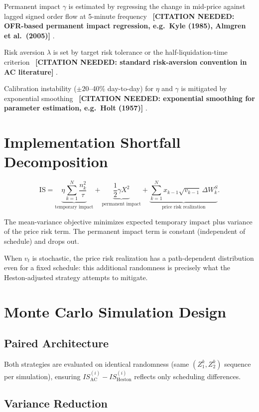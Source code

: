 \documentclass[11pt]{article}
\newcommand{\needscite}[1]{%
  {\color{red}\textbf{[CITATION NEEDED: #1]}}%
}
\begin{document}
Permanent impact $\gamma$ is estimated by regressing the change in mid-price against lagged
signed order flow at 5-minute frequency~\needscite{OFR-based permanent impact regression, e.g.\ Kyle (1985), Almgren et al.\ (2005)}.

Risk aversion $\lambda$ is set by target risk tolerance or the half-liquidation-time
criterion~\needscite{standard risk-aversion convention in AC literature}.

Calibration instability ($\pm20$--40\% day-to-day) for $\eta$ and $\gamma$ is mitigated by
exponential smoothing~\needscite{exponential smoothing for parameter estimation, e.g.\ Holt (1957)}.

\section{Implementation Shortfall Decomposition}
\label{app:is_decomp}

\[
\text{IS}
=
\underbrace{\eta\sum_{k=1}^N \frac{n_k^2}{\tau}}_{\text{temporary impact}}
+
\underbrace{\frac{1}{2}\gamma X^2}_{\text{permanent impact}}
+
\underbrace{\sum_{k=1}^N x_{k-1}\sqrt{v_{k-1}}\,\Delta W_k^S}_{\text{price risk realization}}.
\]

The mean-variance objective minimizes expected temporary impact plus variance of the price
risk term. The permanent impact term is constant (independent of schedule) and drops out.

When $v_t$ is stochastic, the price risk realization has a path-dependent distribution even
for a fixed schedule: this additional randomness is precisely what the Heston-adjusted strategy
attempts to mitigate.

\section{Monte Carlo Simulation Design}
\label{app:montecarlo}

\subsection{Paired Architecture}

Both strategies are evaluated on identical randomness (same $(Z_1^k, Z_2^k)$ sequence per
simulation), ensuring $IS_{\text{AC}}^{(i)} - IS_{\text{Heston}}^{(i)}$ reflects only
scheduling differences.

\subsection{Variance Reduction}
\end{document}
